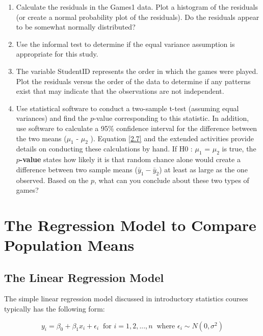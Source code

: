 \documentclass[
]{report}
\providecommand{\tightlist}{%
  \setlength{\itemsep}{0pt}\setlength{\parskip}{0pt}}
\begin{document}
\begin{enumerate}
\def\labelenumi{\arabic{enumi}.}
\setcounter{enumi}{6}
\tightlist
\item
  Calculate the residuals in the Games1 data. Plot a histogram of the residuals (or create a normal probability plot of the residuals). Do the residuals appear to be somewhat normally distributed?
\item
  Use the informal test to determine if the equal variance assumption is appropriate for this study.
\item
  The variable StudentID represents the order in which the games were played. Plot the residuals versus the order of the data to determine if any patterns exist that may indicate that the observations are
  not independent.
\item
  Use statistical software to conduct a two-sample t-test (assuming equal variances) and find the \(p\)-value corresponding to this statistic. In addition, use software to calculate a 95\% confidence interval for
  the difference between the two means (\(\mu_1\) - \(\mu_2\) ). Equation \ref{2.7} and the extended activities provide details on conducting these calculations by hand. If H0 : \(\mu_1\) = \(\mu_2\) is true, the \textbf{\(p\)-value} states how likely it is that random chance alone would create a difference between two sample means (\(\bar{y}_1 - \bar{y}_2\)) at least as large as the one observed. Based on the \(p\), what can you conclude about these two types of
  games?
\end{enumerate}

\newpage

\section{The Regression Model to Compare Population Means}\label{the-regression-model-to-compare-population-means}

\subsection{The Linear Regression Model}\label{the-linear-regression-model}

The simple linear regression model discussed in introductory statistics courses typically has the following form:

\begin{equation} \label{2.2}
y_i = \beta_0 + \beta_1x_i + \epsilon_i ~\text{ for } i = 1, 2, ... , n ~\text{ where } \epsilon_i \sim N(0,\sigma^2)
\tag{2.2}
\end{equation}
\end{document}
